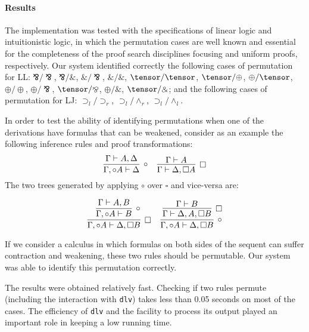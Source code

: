 \paragraph{Results}
The implementation was tested with the specifications of linear logic and
intuitionistic logic, in which
the permutation cases are well known and essential for the completeness of
the proof search disciplines focusing and uniform proofs, respectively. 
Our system identified correctly the following cases of permutation for LL:
$\bindnasrepma / \bindnasrepma$, $\bindnasrepma / \binampersand$, $\binampersand
/ \bindnasrepma$, $\binampersand / \binampersand$,
$\tensor / \tensor$, $\tensor / \oplus$, $\oplus / \tensor$, $\oplus / \oplus$,
$\oplus / \bindnasrepma$, $\tensor / \bindnasrepma$, $\oplus / \binampersand$, $\tensor
/ \binampersand$;
and the following cases of permutation for LJ:
$\supset_l / \supset_r$, $\supset_l / \wedge_r$,
$\supset_l / \wedge_l$.

In order to test the ability of identifying permutations when one of the
derivations have formulas that can be weakened, consider as an example the
following inference rules and proof transformations:
{\small
\[
\infer[\circ]{\Gamma, \circ A \vdash \Delta}{\Gamma \vdash A, \Delta}
\;\;\;\;
\infer[\square]{\Gamma \vdash \Delta, \square A}{\Gamma \vdash A}
\]
}%
The two trees generated by applying $\circ$ over $\square$ and vice-versa are:
\begin{small}
\[
\infer[\square]{\Gamma, \circ A \vdash \Delta, \square B}
{
  \infer[\circ]{\Gamma, \circ A \vdash B}{\Gamma \vdash A, B}
}
\;\;\;\;
\infer[\circ]{\Gamma, \circ A \vdash \Delta, \square B}
{
  \infer[\square]{\Gamma \vdash \Delta, A, \square B}{\Gamma \vdash B}
}
\]
\end{small}%
If we consider a calculus in which formulas on both sides of the sequent can
suffer contraction and weakening, these two rules should be permutable. Our
system was able to identify this permutation correctly.

The results were obtained relatively fast. Checking if two rules permute
(including the interaction with \texttt{dlv}) takes less than 0.05 seconds on
most of the cases. 
The efficiency of \texttt{dlv} and the facility to process
its output played an important role in keeping a low running time.


